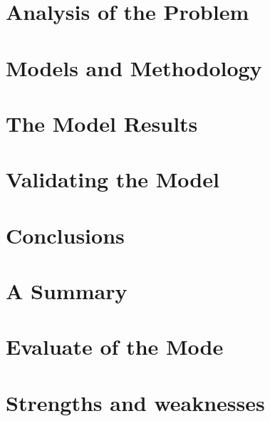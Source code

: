 \documentclass{mcmthesis}
\begin{document}




\section{Analysis of the Problem}

\section{Models and Methodology}

\section{The Model Results}

\section{Validating the Model}

\section{Conclusions}

\section{A Summary}

\section{Evaluate of the Mode}

\section{Strengths and weaknesses}
\end{document}
